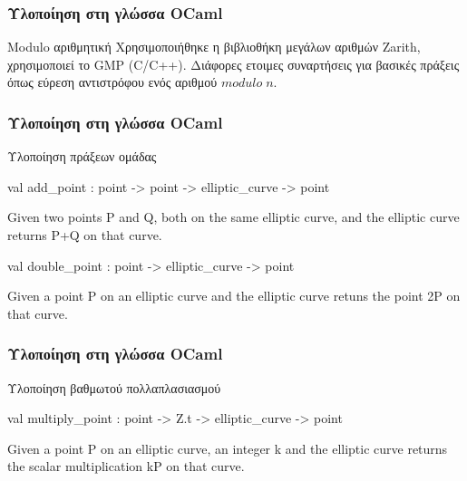 \documentclass{beamer}
\begin{document}
%
\begin{frame}
\frametitle{Υλοποίηση στη γλώσσα OCaml}
\begin{block}
{Modulo αριθμητική}
Χρησιμοποιήθηκε η βιβλιοθήκη μεγάλων αριθμών Zarith, χρησιμοποιεί το GMP (C/C++). Διάφορες ετοιμες συναρτήσεις για βασικές πράξεις όπως εύρεση αντιστρόφου ενός αριθμού $modulo \; n$. 
\end{block}
\end{frame}

%
\begin{frame}
\frametitle{Υλοποίηση στη γλώσσα OCaml}
\begin{block}
{Υλοποίηση πράξεων ομάδας}
\label{val:Ecc.Ecc.add-underscorepoint}\begin{ocamldoccode}
val add\_point : point -> point -> elliptic\_curve -> point
\end{ocamldoccode}
\begin{ocamldocdescription}
Given two points P and Q, both on the same elliptic curve, and the elliptic curve returns P+Q on that curve.
\end{ocamldocdescription}
\label{val:Ecc.Ecc.double-underscorepoint}\begin{ocamldoccode}
val double\_point : point -> elliptic\_curve -> point
\end{ocamldoccode}
\begin{ocamldocdescription}
Given a point P on an elliptic curve and the elliptic curve retuns the point 2P on that curve.
\end{ocamldocdescription}
\end{block}
\end{frame}

%
\begin{frame}
\frametitle{Υλοποίηση στη γλώσσα OCaml}
\begin{block}
{Υλοποίηση βαθμωτού πολλαπλασιασμού}
\label{val:Ecc.Ecc.multiply-underscorepoint}\begin{ocamldoccode}
val multiply\_point : point -> Z.t -> elliptic\_curve -> point
\end{ocamldoccode}
\begin{ocamldocdescription}
Given a point P on an elliptic curve, an integer k and the elliptic curve returns the scalar multiplication kP on that curve.
\end{ocamldocdescription}
\end{block}
\end{frame}
\end{document}

